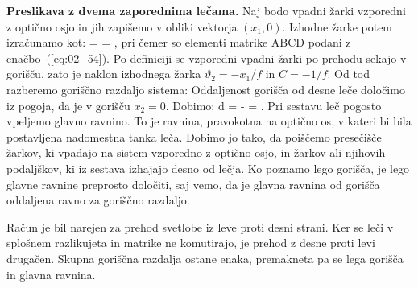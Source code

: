 \begin{example}{\bf Preslikava z dvema zaporednima lečama.}
Naj bodo vpadni žarki vzporedni z optično osjo in jih zapišemo 
v obliki vektorja $(x_1,0)$. Izhodne žarke potem izračunamo kot:
\beq
{}
 = 
\left[\begin{array}{cc}
1& d\\
0&1
\end{array}\right]
\cdot
\left[\begin{array}{cc}
A& B\\
C&D
\end{array}\right]\cdot 
\left[\begin{array}{c}
x_1\\
0
\end{array}\right] = 
\!\!,
\label{eq:02_55}
\eeq
pri čemer so elementi matrike ABCD podani z enačbo~(\ref{eq:02_54}). 
Po definiciji se vzporedni vpadni žarki po prehodu sekajo v gorišču, 
zato je naklon izhodnega žarka $\vartheta_2 = -x_1/f$ in $C = -1/f$. 
Od tod razberemo goriščno razdaljo sistema:
Oddaljenost gorišča od desne leče določimo iz pogoja, da je v gorišču $x_2 = 0$. Dobimo:
\beq
d = - = .
\label{eq:02_56}
\eeq
Pri sestavu leč pogosto vpeljemo glavno ravnino. To je ravnina, pravokotna
na optično os, v kateri bi 
bila postavljena nadomestna tanka leča. Dobimo jo tako, da poiščemo 
presečišče žarkov, ki vpadajo na sistem vzporedno z optično osjo, 
in žarkov ali njihovih podaljškov, ki iz sestava izhajajo desno od lečja. 
Ko poznamo lego gorišča, je lego glavne ravnine preprosto določiti, 
saj vemo, da je glavna ravnina od gorišča oddaljena ravno za goriščno razdaljo.

Račun je bil narejen za prehod svetlobe iz
leve proti desni strani. Ker se leči v splošnem razlikujeta in matrike
ne komutirajo, je prehod z desne proti levi drugačen. Skupna goriščna
razdalja ostane enaka, premakneta pa se lega gorišča in glavna ravnina.
\end{example}

